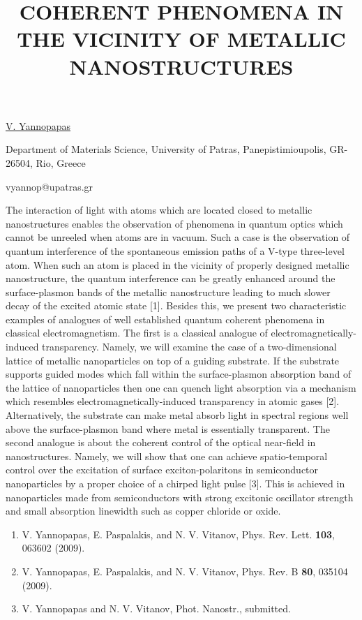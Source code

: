 \title{COHERENT PHENOMENA IN THE VICINITY OF METALLIC NANOSTRUCTURES}

\underline{V. Yannopapas} 

{\normalsize{\vspace{-4mm}
Department of Materials Science, University of Patras, Panepistimioupolis, GR-26504, Rio, Greece

\email vyannop@upatras.gr}}

The interaction of light with atoms which are located closed to metallic nanostructures enables the observation of phenomena in quantum optics which cannot be unreeled when atoms are in vacuum. Such a case is the observation of quantum interference of the spontaneous emission paths of a V-type three-level atom. When such an atom is placed in the vicinity of properly designed metallic nanostructure, the quantum interference can be greatly enhanced around the surface-plasmon bands of the metallic nanostructure leading to much slower decay of the excited atomic state [1]. Besides this, we present two characteristic examples of analogues of well established quantum coherent phenomena in classical electromagnetism. The first is a classical analogue of electromagnetically-induced transparency. Namely, we will examine the case of a two-dimensional lattice of metallic nanoparticles on top of a guiding substrate. If the substrate supports guided modes which fall within the surface-plasmon absorption band of the lattice of nanoparticles then one can quench light absorption via a mechanism which resembles electromagnetically-induced transparency in atomic gases [2]. Alternatively, the substrate can make metal absorb light in spectral regions well above the surface-plasmon band where metal is essentially transparent. The second analogue is about the coherent control of the optical near-field in nanostructures. Namely, we will show that one can achieve spatio-temporal control over the excitation of surface exciton-polaritons in semiconductor nanoparticles by a proper choice of a chirped light pulse [3]. This is achieved in nanoparticles made from semiconductors with strong excitonic oscillator strength and small absorption linewidth such as copper chloride or oxide.

\begin{enumerate}
\item V. Yannopapas, E. Paspalakis, and N. V. Vitanov, Phys. Rev. Lett. \textbf{103}, 063602 (2009).
\item V. Yannopapas, E. Paspalakis, and N. V. Vitanov, Phys. Rev. B \textbf{80}, 035104 (2009).
\item V. Yannopapas and N. V. Vitanov, Phot. Nanostr., submitted.
\end{enumerate}


\vspace{\baselineskip} 